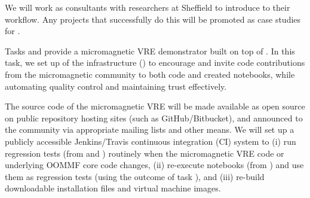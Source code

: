 \begin{workpackage}
\begin{tasklist}
\begin{task}[title=Introduce \TheProject to researchers and teachers, id=project-intro]
We will work as consultants with researchers at Sheffield to introduce
\TheProject to their workflow. Any projects that successfully do this
will be promoted as case studies for \TheProject.
\end{task}

\begin{task}[id=dissemination-of-oommf-nb-virtual-environment,
  title=Open source dissemination of micromagnetic VRE,
  lead=USO,PM=4]
  Tasks  and 
   provide a micromagnetic
  VRE demonstrator built on top of \TheProject. 
  In this task, we set up of the infrastructure () to encourage and
  invite code contributions from the micromagnetic community to both
  code and created notebooks, while
  automating quality control and maintaining trust effectively. 

  The source code of the micromagnetic VRE will be made available as
  open source on public repository hosting sites (such as
  GitHub/Bitbucket), and announced to the community via appropriate
  mailing lists and other means. We will set up a publicly accessible
  Jenkins/Travis continuous integration (CI) system to (i) run
  regression tests (from
   and
  ) routinely when the
  micromagnetic VRE code or underlying OOMMF core code changes, (ii)
  re-execute notebooks (from
  ) and use them as
  regression tests (using the outcome of task
  ), and (iii) re-build
  downloadable installation files and virtual machine images.


\end{task}

\begin{task}[title=Micromagnetic VRE dissemination workshops,
id=dissemination-of-oommf-nb-workshops,lead=USO,PM=6]



\end{task}
\end{tasklist}
\end{workpackage}
